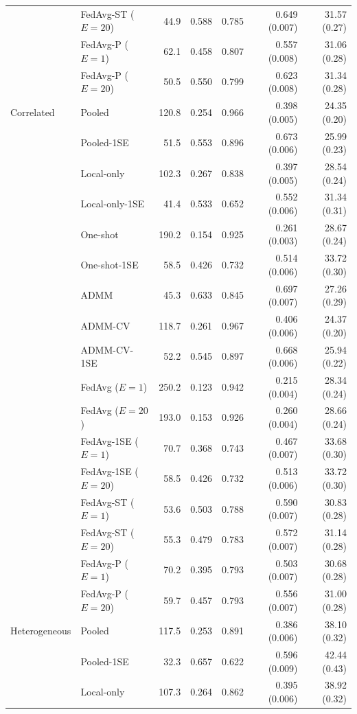 \begin{longtable}{llrrrrr}
 & FedAvg-ST ($E=20$) & 44.9 & 0.588 & 0.785 & 0.649 (0.007) & 31.57 (0.27) \\
 & FedAvg-P ($E=1$) & 62.1 & 0.458 & 0.807 & 0.557 (0.008) & 31.06 (0.28) \\
 & FedAvg-P ($E=20$) & 50.5 & 0.550 & 0.799 & 0.623 (0.008) & 31.34 (0.28) \\
\midrule
Correlated & Pooled & 120.8 & 0.254 & 0.966 & 0.398 (0.005) & 24.35 (0.20) \\
 & Pooled-1SE & 51.5 & 0.553 & 0.896 & 0.673 (0.006) & 25.99 (0.23) \\
 & Local-only & 102.3 & 0.267 & 0.838 & 0.397 (0.005) & 28.54 (0.24) \\
 & Local-only-1SE & 41.4 & 0.533 & 0.652 & 0.552 (0.006) & 31.34 (0.31) \\
 & One-shot & 190.2 & 0.154 & 0.925 & 0.261 (0.003) & 28.67 (0.24) \\
 & One-shot-1SE & 58.5 & 0.426 & 0.732 & 0.514 (0.006) & 33.72 (0.30) \\
 & ADMM & 45.3 & 0.633 & 0.845 & 0.697 (0.007) & 27.26 (0.29) \\
 & ADMM-CV & 118.7 & 0.261 & 0.967 & 0.406 (0.006) & 24.37 (0.20) \\
 & ADMM-CV-1SE & 52.2 & 0.545 & 0.897 & 0.668 (0.006) & 25.94 (0.22) \\
 & FedAvg ($E=1$) & 250.2 & 0.123 & 0.942 & 0.215 (0.004) & 28.34 (0.24) \\
 & FedAvg ($E=20$) & 193.0 & 0.153 & 0.926 & 0.260 (0.004) & 28.66 (0.24) \\
 & FedAvg-1SE ($E=1$) & 70.7 & 0.368 & 0.743 & 0.467 (0.007) & 33.68 (0.30) \\
 & FedAvg-1SE ($E=20$) & 58.5 & 0.426 & 0.732 & 0.513 (0.006) & 33.72 (0.30) \\
 & FedAvg-ST ($E=1$) & 53.6 & 0.503 & 0.788 & 0.590 (0.007) & 30.83 (0.28) \\
 & FedAvg-ST ($E=20$) & 55.3 & 0.479 & 0.783 & 0.572 (0.007) & 31.14 (0.28) \\
 & FedAvg-P ($E=1$) & 70.2 & 0.395 & 0.793 & 0.503 (0.007) & 30.68 (0.28) \\
 & FedAvg-P ($E=20$) & 59.7 & 0.457 & 0.793 & 0.556 (0.007) & 31.00 (0.28) \\
\midrule
Heterogeneous & Pooled & 117.5 & 0.253 & 0.891 & 0.386 (0.006) & 38.10 (0.32) \\
 & Pooled-1SE & 32.3 & 0.657 & 0.622 & 0.596 (0.009) & 42.44 (0.43) \\
 & Local-only & 107.3 & 0.264 & 0.862 & 0.395 (0.006) & 38.92 (0.32) \\

\end{longtable}
